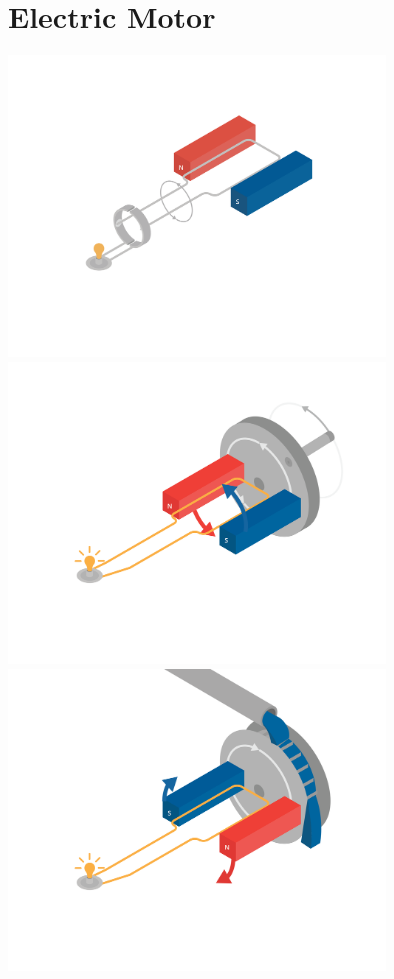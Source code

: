 \chapter{Electric Motor}


\includegraphics[width=0.75\textwidth]{basicGenerator.png}
\includegraphics[width=0.75\textwidth]{basicGeneratorCrank.png}
\includegraphics[width=0.75\textwidth]{basicGeneratorWheel.png}
